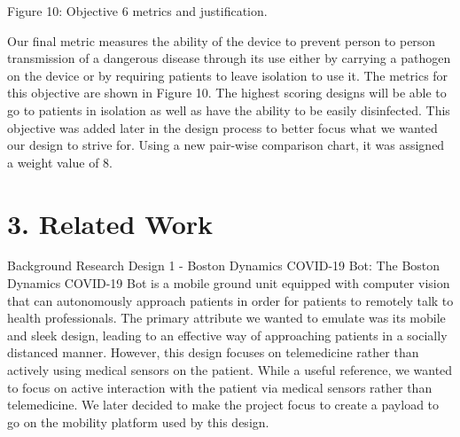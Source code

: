 ﻿\documentclass[10pt]{article}
\begin{document}
%
%	

Figure 10: Objective 6 metrics and justification.


Our final metric measures the ability of the device to prevent person to person transmission of a dangerous disease through its use either by carrying a pathogen on the device or by requiring patients to leave isolation to use it. The metrics for this objective are shown in Figure 10. The highest scoring designs will be able to go to patients in isolation as well as have the ability to be easily disinfected. This objective was added later in the design process to better focus what we wanted our design to strive for. Using a new pair-wise comparison chart, it was assigned a weight value of 8.

\section{3. Related Work}
Background Research Design 1 - Boston Dynamics COVID-19 Bot: The Boston Dynamics COVID-19 Bot is a mobile ground unit equipped with computer vision that can autonomously approach patients in order for patients to remotely talk to health professionals. The primary attribute we wanted to emulate was its mobile and sleek design, leading to an effective way of approaching patients in a socially distanced manner. However, this design focuses on telemedicine rather than actively using medical sensors on the patient. While a useful reference, we wanted to focus on active interaction with the patient via medical sensors rather than telemedicine. We later decided to make the project focus to create a payload to go on the mobility platform used by this design.
\end{document}
